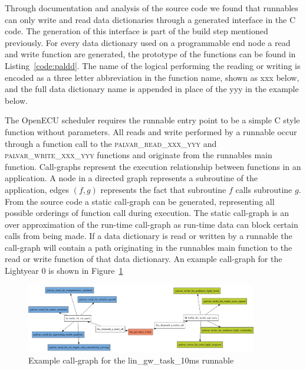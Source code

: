 Through documentation and analysis of the source code we found that runnables can only write and read data dictionaries through a generated interface in the C code. The generation of this interface is part of the build step mentioned previously. For every data dictionary used on a programmable end node a read and write function are generated, the prototype of the functions can be found in Listing~\ref{code:paldd}. The name of the logical performing the reading or writing is encoded as a three letter abbreviation in the function name, shown as xxx below, and the full data dictionary name is appended in place of the yyy in the example below.



The OpenECU scheduler requires the runnable entry point to be a simple C style function without parameters. All reads and write performed by a runnable occur through a function call to the \textsc{palvar\_read\_xxx\_yyy} and \textsc{palvar\_write\_xxx\_yyy} functions and originate from the runnables main function. Call-graphs represent the execution relationship between functions in an application. A node in a directed graph represents a subroutine of the application, edges $(f,g)$ represents the fact that subroutine $f$ calls subroutine $g$. From the source code a static call-graph can be generated, representing all possible orderings of function call during execution. The static call-graph is an over approximation of the run-time call-graph as run-time data can block certain calls from being made. If a data dictionary is read or written by a runnable the call-graph will contain a path originating in the runnables main function to the read or write function of that data dictionary. An example call-graph for the Lightyear 0 is shown in Figure~\ref{fig:callgraph}

\begin{figure}[htb]
    \centering
    \includegraphics[width=0.9\textwidth]{images/callgraph.png}
    \caption{Example call-graph for the lin\_gw\_task\_10ms runnable}
    \label{fig:callgraph}
\end{figure}

